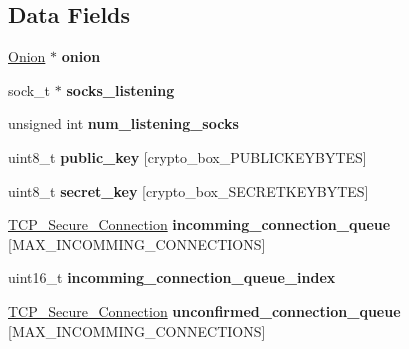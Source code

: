\subsection*{Data Fields}
\begin{DoxyCompactItemize}
\item 
\hypertarget{struct_t_c_p___server_a66fb4bf67c711a5ed3e7bbecec7fde30}{\hyperlink{struct_onion}{Onion} $\ast$ {\bfseries onion}}\label{struct_t_c_p___server_a66fb4bf67c711a5ed3e7bbecec7fde30}

\item 
\hypertarget{struct_t_c_p___server_a120d7e1abddb3a838bc0d0442f4ad8e6}{sock\+\_\+t $\ast$ {\bfseries socks\+\_\+listening}}\label{struct_t_c_p___server_a120d7e1abddb3a838bc0d0442f4ad8e6}

\item 
\hypertarget{struct_t_c_p___server_a5efc50bc21a4b488b17bb593b2758718}{unsigned int {\bfseries num\+\_\+listening\+\_\+socks}}\label{struct_t_c_p___server_a5efc50bc21a4b488b17bb593b2758718}

\item 
\hypertarget{struct_t_c_p___server_aaa806bb1136fb3d4b5d8d8970b596ff7}{uint8\+\_\+t {\bfseries public\+\_\+key} \mbox{[}crypto\+\_\+box\+\_\+\+P\+U\+B\+L\+I\+C\+K\+E\+Y\+B\+Y\+T\+E\+S\mbox{]}}\label{struct_t_c_p___server_aaa806bb1136fb3d4b5d8d8970b596ff7}

\item 
\hypertarget{struct_t_c_p___server_a41928223d6ad8bd41837f371deef62ae}{uint8\+\_\+t {\bfseries secret\+\_\+key} \mbox{[}crypto\+\_\+box\+\_\+\+S\+E\+C\+R\+E\+T\+K\+E\+Y\+B\+Y\+T\+E\+S\mbox{]}}\label{struct_t_c_p___server_a41928223d6ad8bd41837f371deef62ae}

\item 
\hypertarget{struct_t_c_p___server_aee7190e93d63765a9a2642895d6ec8b0}{\hyperlink{struct_t_c_p___secure___connection}{T\+C\+P\+\_\+\+Secure\+\_\+\+Connection} {\bfseries incomming\+\_\+connection\+\_\+queue} \mbox{[}M\+A\+X\+\_\+\+I\+N\+C\+O\+M\+M\+I\+N\+G\+\_\+\+C\+O\+N\+N\+E\+C\+T\+I\+O\+N\+S\mbox{]}}\label{struct_t_c_p___server_aee7190e93d63765a9a2642895d6ec8b0}

\item 
\hypertarget{struct_t_c_p___server_a3365834b14a58220182399bdc98198f9}{uint16\+\_\+t {\bfseries incomming\+\_\+connection\+\_\+queue\+\_\+index}}\label{struct_t_c_p___server_a3365834b14a58220182399bdc98198f9}

\item 
\hypertarget{struct_t_c_p___server_a8e84d42c724209bf3967de32506beeba}{\hyperlink{struct_t_c_p___secure___connection}{T\+C\+P\+\_\+\+Secure\+\_\+\+Connection} {\bfseries unconfirmed\+\_\+connection\+\_\+queue} \mbox{[}M\+A\+X\+\_\+\+I\+N\+C\+O\+M\+M\+I\+N\+G\+\_\+\+C\+O\+N\+N\+E\+C\+T\+I\+O\+N\+S\mbox{]}}\label{struct_t_c_p___server_a8e84d42c724209bf3967de32506beeba}


\end{DoxyCompactItemize}
